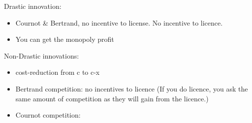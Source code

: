 \documentclass[12pt, a4paper, titlepage]{extarticle}
\begin{document}
Drastic innovation:
\begin{itemize}
    \item Cournot & Bertrand, no incentive to license. No incentive to licence. \item You can get the monopoly profit
\end{itemize}
Non-Drastic innovations:
\begin{itemize}
    \item cost-reduction from c to c-x 
    \item Bertrand competition: no incentives to licence (If you do licence, you ask the same amount of competition as they will gain from the licence.)
    \item Cournot competition:  
\end{itemize}
\end{document}
